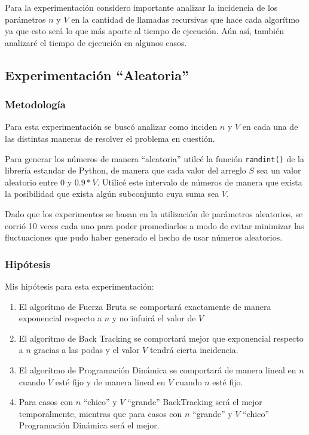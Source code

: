 Para la experimentaci\'on considero importante analizar la incidencia de los par\'ametros
$n$ y $V$ en la cantidad de llamadas recursivas que hace cada algor\'itmo ya que esto ser\'a lo que m\'as
aporte al tiempo de ejecuci\'on. A\'un as\'i, tambi\'en analizar\'e el tiempo de ejecuci\'on en algunos casos.

\subsection{Experimentaci\'on ``Aleatoria''}
\subsubsection{Metodolog\'ia}
\par Para esta experimentaci\'on se busc\'o analizar como inciden $n$ y $V$ en cada una
de las distintas maneras de resolver el problema en cuesti\'on. 
\par Para generar los n\'umeros de manera ``aleatoria'' utilc\'e la funci\'on \texttt{randint()} 
de la librer\'ia estandar de Python, de manera que cada valor del arreglo $S$ sea un valor aleatorio entre $0$ y
$0.9*V$. Utilic\'e este intervalo de n\'umeros de manera que exista la posibilidad que exista alg\'un subconjunto
cuya suma sea $V$.
\par Dado que los experimentos se basan en la utilizaci\'on de par\'ametros aleatorios, se corri\'o 10 veces cada
uno para poder promediarlos a modo de evitar minimizar las fluctuaciones que pudo haber generado el hecho de usar
n\'umeros aleatorios.

\subsubsection{Hip\'otesis}
Mis hip\'otesis para esta experimentaci\'on:
\begin{enumerate}[I]
    \item El algor\'itmo de Fuerza Bruta se comportar\'a exactamente de manera exponencial respecto a $n$ y no 
    infuir\'a el valor de $V$
    \item El algor\'itmo de Back Tracking se comportar\'a mejor que exponencial respecto a $n$ gracias a las podas
    y el valor $V$ tendr\'a cierta incidencia.
    \item El algor\'itmo de Programaci\'on Din\'amica se comportar\'a de manera lineal en $n$ cuando $V$ est\'e fijo
    y de manera lineal en $V$ cuando $n$ est\'e fijo.
    \item Para casos con $n$ ``chico'' y $V$ ``grande'' BackTracking ser\'a el mejor temporalmente, mientras que para 
    casos con $n$ ``grande'' y $V$ ``chico'' Programaci\'on Din\'amica ser\'a el mejor.
\end{enumerate}


